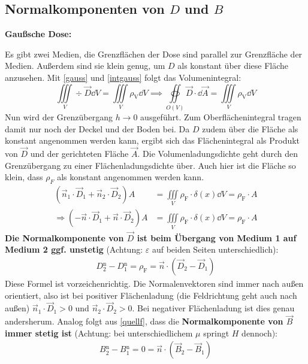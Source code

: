   \subsection{Normalkomponenten von ${D}$ und ${B}$}
	  \textbf{Gaußsche Dose:}
	  \begin{center}
		  \resizebox{.3\textwidth}{!}{}
	  \end{center}
	  Es gibt zwei Medien, die Grenzflächen der Dose sind parallel zur Grenzfläche der Medien. Außerdem sind sie klein genug, um $D$ als konstant über diese Fläche anzusehen. Mit \ref{gauss} und \ref{intgauss} folgt das Volumenintegral:
		        $$\iiint\limits_{V}\div \vec{D}\dd V = \iiint\limits_{V}\rho_{\text{V}}\dd V \implies \oiint\limits_{O(V)}\vec{D}\cdot \dd\vec{A}= \iiint\limits_{V}\rho_{\text{V}}\dd V$$ Nun wird der Grenzübergang $h\to0$ ausgeführt. Zum Oberflächenintegral tragen damit nur noch der Deckel und der Boden bei. Da $D$ zudem über die Fläche als konstant angenommen werden kann, ergibt sich das Flächenintegral als Produkt von $\vec{D}$ und der gerichteten Fläche $\vec{A}$. Die Volumenladungsdichte geht durch den Grenzübergang zu einer Flächenladungsdichte über. Auch hier ist die Fläche so klein, dass $\rho_F$ als konstant angenommen werden kann.
		   \begin{equation*}
\begin{split}\left( \vec{n}_{1}\cdot \vec{D}_{1} + \vec{n}_{2}\cdot \vec{D}_{2}\right) A &= \iiint\limits_{V}\rho_{\text{F}}\cdot \delta(x) \dd V = \rho_{\text{F}}\cdot A\\
		       \Rightarrow \left( - \vec{n}\cdot \vec{D}_{1} + \vec{n}\cdot \vec{D}_{2}\right) A &= \iiint\limits_{V}\rho_{\text{F}}\cdot \delta(x) \dd V = \rho_{\text{F}}\cdot A \end{split}   	
		        \end{equation*}
		   \textbf{Die Normalkomponente von $\vec{D}$ ist beim Übergang von Medium 1 auf Medium 2 ggf. unstetig} (Achtung: $\varepsilon$ auf beiden Seiten unterschiedlich):
		        \begin{equation}\label{normD}\begin{split}
				        \boxed{D{}_2^\text{n} - D{}_1^\text{n} = \rho_\text{F} = \vec{n}\cdot \left(\vec{D}_2-\vec{D}_1\right)}
			        \end{split}\end{equation}
		  Diese Formel ist vorzeichenrichtig. Die Normalenvektoren sind immer nach außen orientiert, also ist bei positiver Flächenladung (die Feldrichtung geht auch nach außen) $\vec{n}_1\cdot \vec{D}_1>0$ und $\vec{n}_2\cdot \vec{D}_2>0$. Bei negativer Flächenladung ist dies genau andersherum. Analog folgt aus \ref{quellf}, dass die
		   \textbf{Normalkomponente von $\vec{B}$ immer stetig ist} (Achtung: bei unterschiedlichem $\mu$ springt $H$ dennoch):
		        \begin{equation}\begin{split}\label{normB}
				        \boxed{B{}_2^\text{n} - B{}_1^\text{n} = 0=\vec{n}\cdot\left(\vec{B}_2-\vec{B}_1\right)}
			        \end{split}\end{equation}

